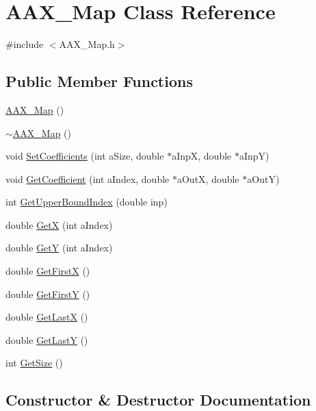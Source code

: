 \hypertarget{a00118}{}\section{A\+A\+X\+\_\+\+Map Class Reference}
\label{a00118}


{\ttfamily \#include $<$A\+A\+X\+\_\+\+Map.\+h$>$}

\subsection*{Public Member Functions}
\begin{DoxyCompactItemize}
\item 
\hyperlink{a00118_af8f82cb6fc13729dde0eef7cd9ac3846}{A\+A\+X\+\_\+\+Map} ()
\item 
\hyperlink{a00118_a1ebcf52434b45b6e64f5a559efba9bdb}{$\sim$\+A\+A\+X\+\_\+\+Map} ()
\item 
void \hyperlink{a00118_a0023c63be213ba32b1c50eca2301edf7}{Set\+Coefficients} (int a\+Size, double $\ast$a\+Inp\+X, double $\ast$a\+Inp\+Y)
\item 
void \hyperlink{a00118_a7776a526306675b9a302efea3941d41a}{Get\+Coefficient} (int a\+Index, double $\ast$a\+Out\+X, double $\ast$a\+Out\+Y)
\item 
int \hyperlink{a00118_a20957b576d8a3a8b04596adf7c24ff07}{Get\+Upper\+Bound\+Index} (double inp)
\item 
double \hyperlink{a00118_a5448134aa48e106699d799d7cac3794d}{Get\+X} (int a\+Index)
\item 
double \hyperlink{a00118_a095b47a4216633fe5167e3d661f80371}{Get\+Y} (int a\+Index)
\item 
double \hyperlink{a00118_a1933116dc2522c0d2196ed36c2d99bcc}{Get\+First\+X} ()
\item 
double \hyperlink{a00118_aa41cd9f24307874e62e07f75d637dde6}{Get\+First\+Y} ()
\item 
double \hyperlink{a00118_a8f3190a633e010e6f521b8582705e29b}{Get\+Last\+X} ()
\item 
double \hyperlink{a00118_add422d45b54cd4c109a5764434bbe6d6}{Get\+Last\+Y} ()
\item 
int \hyperlink{a00118_a51dd6cb01b5b743536765d559907de28}{Get\+Size} ()
\end{DoxyCompactItemize}


\subsection{Constructor \& Destructor Documentation}
\hypertarget{a00118_af8f82cb6fc13729dde0eef7cd9ac3846}{}
